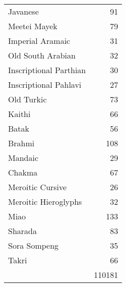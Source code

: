 \begin{longtable}{lr}
Javanese	&91\\
Meetei Mayek	&79\\
Imperial Aramaic	&31\\
Old South Arabian	&32\\
Inscriptional Parthian	 &30\\
Inscriptional Pahlavi	&27\\
Old Turkic	&73\\
Kaithi	 &66\\
Batak	 &56\\
Brahmi	 &108\\
Mandaic	&29\\
Chakma	&67\\
Meroitic Cursive	&26\\
Meroitic Hieroglyphs	&32\\
Miao	&133\\
Sharada	&83\\
Sora Sompeng	&35\\
Takri	&66\\
	
	&110181\\
\end{longtable}

\egroup